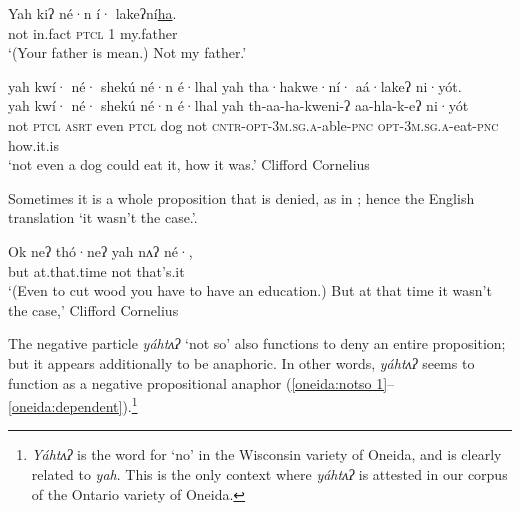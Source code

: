\documentclass[output=paper,colorlinks,citecolor=brown]{langscibook}
\begin{document}
\ea\label{oneida:notso 7}
    \gll Yah kiʔ né·n í· lakeʔní\uline{ha}. \\
    not {in.fact} \textsc{ptcl} \textsc{1} {my.father} \\
    \glt `(Your father is mean.) Not my father.' 
\z%

\ea\label{oneida:notso 5}
    \glll yah kwí· né· shekú né·n é·lhal yah tha·hakwe·ní· aá·lakeʔ ni·y\'ot. \\
    yah kwí· né· shekú né·n é·lhal 	yah th-aa-ha-kweni-ʔ aa-hla-k-eʔ ni·y\'ot \\
    not \textsc{ptcl} \textsc{asrt} even \textsc{ptcl} dog not \textsc{cntr-opt-3m.sg.a}-able-\textsc{pnc} \textsc{opt-3m.sg.a}-eat-\textsc{pnc} {how.it.is} \\
    \glt `not even a dog could eat it, how it was.'  Clifford Cornelius \citep[225 (53)]{MichelsonEtAl2016}
\z


Sometimes it is a whole proposition that is denied, as in ; hence the English translation `it wasn't the case.'.

\ea\label{oneida:notso 8}
    \gll Ok  {neʔ th\'o·neʔ} yah  {nʌʔ né·}, \\
    but {at.that.time} not {that's.it} \\ 
    \glt `(Even to cut wood you have to have an education.) But at that time it wasn't the case,'  Clifford Cornelius \citep[236 (116)]{MichelsonEtAl2016}
\z 


The negative particle \textit{yáhtʌʔ} `not so' also functions to deny an entire proposition; but it appears additionally to be anaphoric. In other words, \textit{yáhtʌʔ} seems to function as a negative propositional anaphor (\ref{oneida:notso 1}--\ref{oneida:dependent}).\footnote{\textit{Yáhtʌʔ} is the word for `no' in the Wisconsin variety of Oneida, and is clearly related to \textit{yah}. This is  the only context where \textit{yáhtʌʔ} is attested in our corpus of the Ontario variety of Oneida.}
\end{document}
